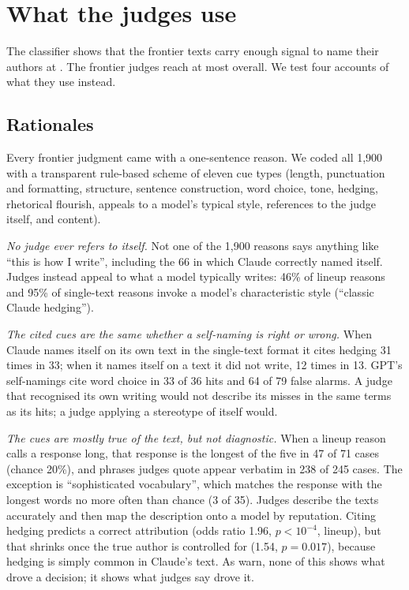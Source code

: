 \section{What the judges use}
\label{sec:mechanism}

The classifier shows that the frontier texts carry enough signal to name
their authors at \EngineAAcc{}. The frontier judges reach at most
\GPTOverallLineup{} overall. We test four accounts of what they use instead.

\subsection{Rationales}
\label{sec:rationales}
Every frontier judgment came with a one-sentence reason. We coded all 1,900
with a transparent rule-based scheme of eleven cue types (length,
punctuation and formatting, structure, sentence construction, word choice,
tone, hedging, rhetorical flourish, appeals to a model's typical style,
references to the judge itself, and content). \RationaleValidation{}

\emph{No judge ever refers to itself.} Not one of the 1,900 reasons says
anything like ``this is how I write'', including the 66 in which Claude
correctly named itself. Judges instead appeal to what a model typically
writes: 46\% of lineup reasons and 95\% of single-text reasons invoke a
model's characteristic style (``classic Claude hedging'').

\emph{The cited cues are the same whether a self-naming is right or wrong.}
When Claude names itself on its own text in the single-text format it cites
hedging 31 times in 33; when it names itself on a text it did not write, 12
times in 13. GPT's self-namings cite word choice in 33 of 36 hits and 64 of
79 false alarms. A judge that recognised its own writing would not describe
its misses in the same terms as its hits; a judge applying a stereotype of
itself would.

\emph{The cues are mostly true of the text, but not diagnostic.} When a
lineup reason calls a response long, that response is the longest of the
five in 47 of 71 cases (chance 20\%), and phrases judges quote appear
verbatim in 238 of 245 cases. The exception is ``sophisticated vocabulary'',
which matches the response with the longest words no more often than chance
(3 of 35). Judges describe the texts accurately and then map the description
onto a model by reputation. Citing hedging predicts a correct attribution
(odds ratio 1.96, $p<10^{-4}$, lineup), but that shrinks once the true
author is controlled for (1.54, $p=0.017$), because hedging is simply common
in Claude's text. As \citet{marioriyad2025silent} warn, none of this shows
what drove a decision; it shows what judges say drove it.

